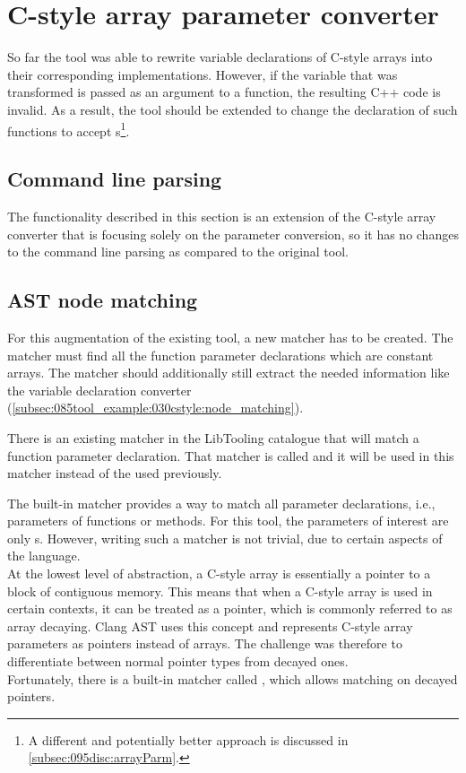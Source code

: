 
\section{C-style array parameter converter} \label{sec:080:035:cstyleArrayParm}

So far the tool was able to rewrite variable declarations of C-style arrays into their corresponding  implementations. However, if the variable that was transformed is passed as an argument to a function, the resulting C++ code is invalid.
As a result, the tool should be extended to change the declaration of such functions to accept s\footnote{
    A different and potentially better approach is discussed in \cref{subsec:095disc:arrayParm}.
}.

\subsection{Command line parsing}

The functionality described in this section is an extension of the C-style array converter that is focusing solely on the parameter conversion, so it has no changes to the command line parsing as compared to the original tool.

\subsection{AST node matching}\label{subsec:085tool:ast_matching}

For this augmentation of the existing tool, a new matcher has to be created. The matcher must find all the function parameter declarations which are constant arrays. The matcher should additionally still extract the needed information like the variable declaration converter (\cref{subsec:085tool_example:030cstyle:node_matching}).

There is an existing matcher in the LibTooling catalogue that will match a function parameter declaration. That matcher is called  and it will be used in this matcher instead of the  used previously.

The built-in matcher  provides a way to match all parameter declarations, i.e., parameters of functions or methods. For this tool, the parameters of interest are only s. However, writing such a matcher is not trivial, due to certain aspects of the language.\\
At the lowest level of abstraction, a C-style array is essentially a pointer to a block of contiguous memory.
This means that when a C-style array is used in certain contexts, it can be treated as a pointer, which is commonly referred to as array decaying.
Clang AST uses this concept and represents C-style array parameters as pointers instead of arrays.
The challenge was therefore to differentiate between normal pointer types from decayed ones.\\
Fortunately, there is a built-in matcher called , which allows matching on decayed pointers.

